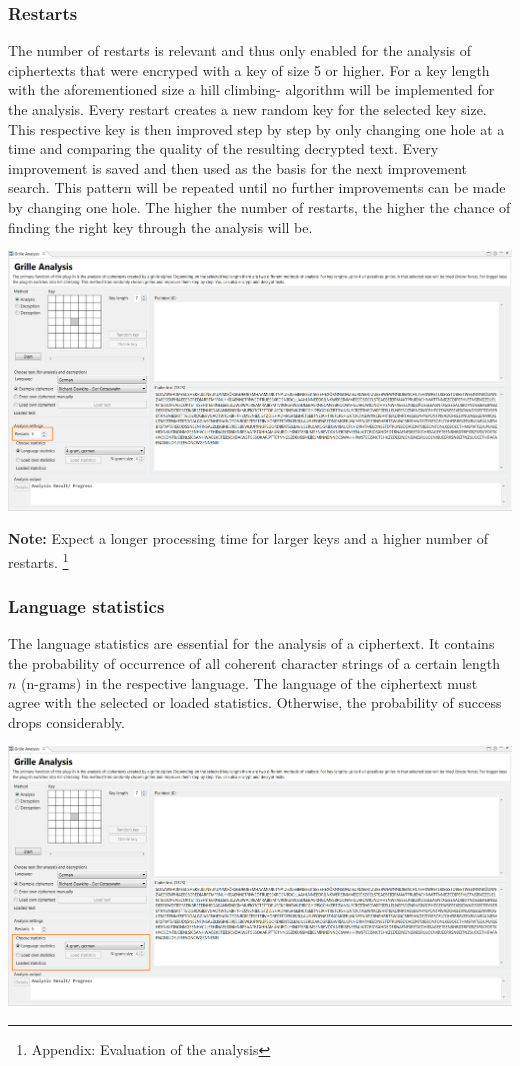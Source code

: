 \documentclass[fontsize=12pt, DIV=15, parskip=half-]{scrartcl}
\theoremstyle{break}
\begin{document}
\subsubsection{Restarts}
The number of \glqq restarts\grqq{} is relevant and thus only enabled for the analysis of ciphertexts that were encryped with a key of size 5 or higher. For a key length with the aforementioned size a \glqq hill climbing\grqq- algorithm will be implemented for the analysis. Every restart creates a new random key for the selected key size. This respective key is then improved step by step by only changing one hole at a time and comparing the quality of the resulting decrypted text. Every improvement is saved and then used as the basis for the next improvement search. This pattern will be repeated until no further improvements can be made by changing one hole.
The higher the number of restarts, the higher the chance of finding the right key through the analysis will be.

\includegraphics[scale=0.45]{enFleissnerRestarts.png}

\textbf{Note:} Expect a longer processing time for larger keys and a higher number of restarts. \footnote{Appendix: Evaluation of the analysis}

\subsubsection{Language statistics}
The language statistics are essential for the analysis of a ciphertext. It contains the probability of occurrence of all coherent character strings of a certain length $n$ (n-grams) in the respective language. The language of the ciphertext must agree with the selected or loaded statistics. Otherwise, the probability of success drops considerably.

\includegraphics[scale=0.45]{enFleissnerStatistics.png}
\end{document}
